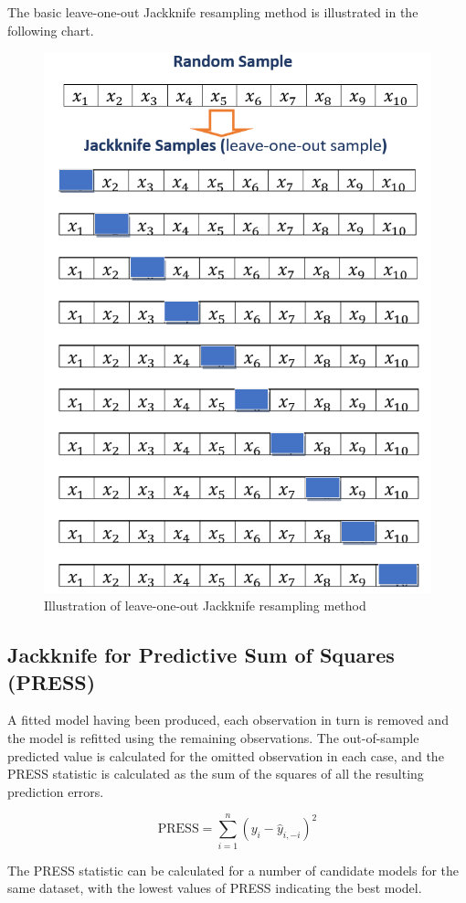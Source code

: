 \documentclass[
]{book}
\begin{document}
The basic leave-one-out Jackknife resampling method is illustrated in the following chart.

\begin{figure}

{\centering \includegraphics[width=0.5\linewidth]{img05/w05-JackknifeResampling} 

}

\caption{Illustration of leave-one-out Jackknife resampling method}\label{fig:unnamed-chunk-98}
\end{figure}

\hypertarget{jackknife-for-predictive-sum-of-squares-press}{%
\subsection{Jackknife for Predictive Sum of Squares (PRESS)}\label{jackknife-for-predictive-sum-of-squares-press}}

A fitted model having been produced, each observation in turn is removed and the model is refitted using the remaining observations. The out-of-sample predicted value is calculated for the omitted observation in each case, and the PRESS statistic is calculated as the sum of the squares of all the resulting prediction errors.

\[
\text{PRESS}=\sum _{{i=1}}^{n}(y_{i}-{\hat  {y}}_{{i,-i}})^{2}
\]

The PRESS statistic can be calculated for a number of candidate models for the same dataset, with the lowest values of PRESS indicating the best model.
\end{document}
